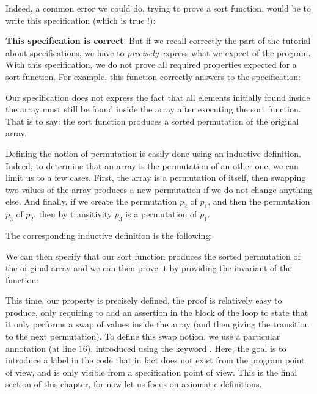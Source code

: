 Indeed, a common error we could do, trying to prove a sort function, would
be to write this specification (which is true !):




\textbf{This specification is correct}. But if we recall correctly the part of the
tutorial about specifications, we have to \emph{precisely} express what we expect
of the program. With this specification, we do not prove all required properties
expected for a sort function. For example, this function correctly answers to
the specification:




Our specification does not express the fact that all elements initially found
inside the array must still be found inside the array after executing the
sort function. That is to say: the sort function produces a sorted permutation
of the original array.

Defining the notion of permutation is easily done using an inductive definition.
Indeed, to determine that an array is the permutation of an other one, we can
limit us to a few cases. First, the array is a permutation of itself, then
swapping two values of the array produces a new permutation if we do not change
anything else. And finally, if we create the permutation $p_2$ of $p_1$, and then
the permutation $p_3$ of $p_2$, then by transitivity $p_3$ is a permutation of
$p_1$.

The corresponding inductive definition is the following:




We can then specify that our sort function produces the sorted permutation of
the original array and we can then prove it by providing the invariant of the
function:





This time, our property is precisely defined, the proof is relatively easy to
produce, only requiring to add an assertion in the block of the loop to state
that it only performs a swap of values inside the array (and then giving
the transition to the next permutation). To define this swap notion, we use
a particular annotation (at line 16), introduced using the keyword
. Here, the goal is to introduce a label in the code that in
fact does not exist from the program point of view, and is only visible from
a specification point of view. This is the final section of this chapter, for
now let us focus on axiomatic definitions.



